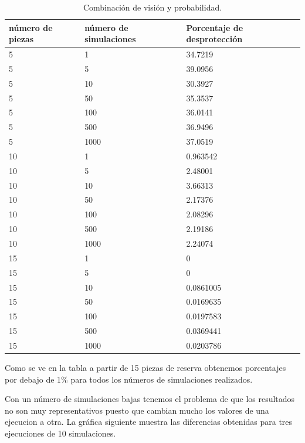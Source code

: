 \documentclass[]{article}
\begin{document}
 \begin{table}[H]
	\begin{center}
		\resizebox{12.5cm}{!} {
			\begin{tabular}{|l|l|l|}
				\hline
				número de piezas & número de simulaciones & Porcentaje de desprotección \\
				\hline \hline
				5 & 1 & 34.7219
				\\ \hline
				5 & 5 & 39.0956
				\\ \hline
				5 & 10 & 30.3927
				\\ \hline
				5 & 50 & 35.3537
				\\ \hline
				5 & 100 & 36.0141
				\\ \hline
				5 & 500 & 36.9496
				\\ \hline
				5 & 1000 & 37.0519
				\\ \hline
				10 & 1 & 0.963542
				\\ \hline
				10 & 5 & 2.48001
				\\ \hline
				10 & 10 & 3.66313
				\\ \hline 
				10 & 50 & 2.17376
				\\ \hline
				10 & 100 & 2.08296
				\\ \hline
				10 & 500 & 2.19186
				\\ \hline
				10 & 1000 & 2.24074
				\\ \hline
				15 & 1 & 0
				\\ \hline
				15 & 5 & 0
				\\ \hline
				15 & 10 & 0.0861005
				\\ \hline
				15 & 50 & 0.0169635
				\\ \hline
				15 & 100 & 0.0197583
				\\ \hline
				15 & 500 & 0.0369441
				\\ \hline
				15 & 1000 & 0.0203786
				\\ \hline
				
			\end{tabular}
		}
		\caption{Combinación de visión y probabilidad.}
		\label{tabla:sencilla}
	\end{center}
\end{table}
Como se ve en la tabla a partir de 15 piezas de reserva obtenemos porcentajes por debajo de 1\% para todos los números de simulaciones realizados.

Con un número de simulaciones bajas tenemos el problema de que los resultados no son muy representativos puesto que cambian mucho los valores de una ejecucion a otra. La gráfica siguiente muestra las diferencias obtenidas para tres ejecuciones de 10 simulaciones.
\end{document}
